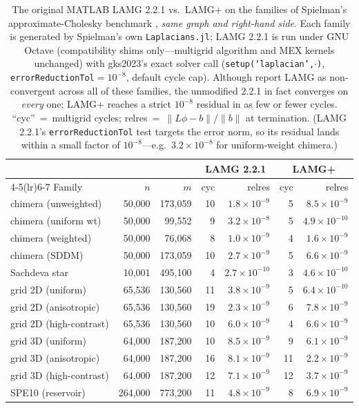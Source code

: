 \begin{table}[t]\centering
\caption{The original MATLAB LAMG 2.2.1 vs.\ LAMG+ on the families of Spielman's
approximate-Cholesky benchmark \cite{gks2023}, \emph{same graph and right-hand side}. Each
family is generated by Spielman's own \texttt{Laplacians.jl}; LAMG 2.2.1 is run under GNU
Octave (compatibility shims only---multigrid algorithm and MEX kernels unchanged) with
gks2023's exact solver call (\texttt{setup(`laplacian',$\cdot$)}, \texttt{errorReductionTol}$=10^{-8}$,
default cycle cap). Although \cite{gks2023} report LAMG as non-convergent across all of these
families, the unmodified 2.2.1 in fact converges on \emph{every} one; LAMG+ reaches a strict
$10^{-8}$ residual in as few or fewer cycles. ``cyc''~=~multigrid cycles; relres~=~$\|L\phi-b\|/\|b\|$ at
termination. (LAMG 2.2.1's \texttt{errorReductionTol} test targets the error norm, so its residual
lands within a small factor of $10^{-8}$---e.g.\ $3.2\!\times\!10^{-8}$ for uniform-weight chimera.)}
\label{tab:lamgorig}
\begin{tabular}{l r r r r r r}
\toprule
 & & & \multicolumn{2}{c}{LAMG 2.2.1} & \multicolumn{2}{c}{LAMG+}\\
\cmidrule(lr){4-5}\cmidrule(lr){6-7}
Family & $n$ & $m$ & cyc & relres & cyc & relres\\
\midrule
chimera (unweighted) & 50,000 & 173,059 & 10 & $1.8\!\times\!10^{-9}$ & 5 & $8.5\!\times\!10^{-9}$\\
chimera (uniform wt) & 50,000 & 99,552 & 9 & $3.2\!\times\!10^{-8}$ & 5 & $4.9\!\times\!10^{-10}$\\
chimera (weighted) & 50,000 & 76,068 & 8 & $1.0\!\times\!10^{-9}$ & 4 & $1.6\!\times\!10^{-9}$\\
chimera (SDDM) & 50,000 & 173,059 & 10 & $2.7\!\times\!10^{-9}$ & 5 & $6.6\!\times\!10^{-9}$\\
Sachdeva star & 10,001 & 495,100 & 4 & $2.7\!\times\!10^{-10}$ & 3 & $4.6\!\times\!10^{-10}$\\
grid 2D (uniform) & 65,536 & 130,560 & 11 & $3.8\!\times\!10^{-9}$ & 5 & $6.4\!\times\!10^{-10}$\\
grid 2D (anisotropic) & 65,536 & 130,560 & 19 & $2.3\!\times\!10^{-9}$ & 6 & $7.8\!\times\!10^{-9}$\\
grid 2D (high-contrast) & 65,536 & 130,560 & 10 & $6.0\!\times\!10^{-9}$ & 4 & $6.6\!\times\!10^{-9}$\\
grid 3D (uniform) & 64,000 & 187,200 & 10 & $8.5\!\times\!10^{-9}$ & 9 & $6.1\!\times\!10^{-9}$\\
grid 3D (anisotropic) & 64,000 & 187,200 & 16 & $8.1\!\times\!10^{-9}$ & 11 & $2.2\!\times\!10^{-9}$\\
grid 3D (high-contrast) & 64,000 & 187,200 & 12 & $7.1\!\times\!10^{-9}$ & 12 & $3.7\!\times\!10^{-9}$\\
SPE10 (reservoir) & 264,000 & 773,200 & 11 & $4.8\!\times\!10^{-9}$ & 8 & $6.9\!\times\!10^{-9}$\\
\bottomrule
\end{tabular}
\end{table}
